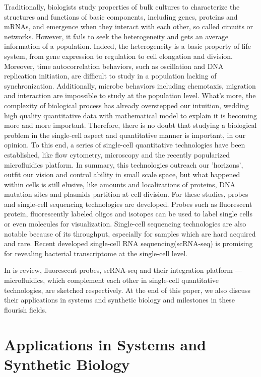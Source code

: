 \documentclass[fleqn,10pt]{wlscirep}
\begin{document}
Traditionally, biologists study properties of bulk cultures to characterize the structures and functions of basic components, including genes, proteins and mRNAs, and emergence when they interact with each other, so called circuits or networks. However, it fails to seek the heterogeneity and gets an average information of a population. Indeed, the heterogeneity is a basic property of life system, from gene expression to regulation to cell elongation and division. Moreover, time autocorrelation behaviors, such as oscillation\cite{Ishiura1998, Elowitz2000} and DNA replication initiation\cite{Wang2010, Wallden2016}, are difficult to study in a population lacking of synchronization. Additionally, microbe behaviors including chemotaxis, migration and interaction are impossible to study at the population level. What's more, the complexity of biological process has already overstepped our intuition, wedding high quality quantitative data with mathematical model to explain it is becoming more and more important\cite{Amir:2018b4f}. Therefore, there is no doubt that studying a biological problem in the single-cell aspect and quantitative manner is important, in our opinion. To this end, a series of single-cell quantitative technologies have been established, like flow cytometry, microscopy and the recently popularized microfluidics platform. In summary, this technologies outreach our 'horizons', outfit our vision and control ability in small scale space, but what happened within cells is still elusive, like amounts and localizations of proteins, DNA mutation sites and plasmids partition at cell division. For these studies, probes and single-cell sequencing technologies are developed. Probes such as fluorescent protein, fluorescently labeled oligos and isotopes can be used to label single cells or even molecules for visualization. Single-cell sequencing technologies are also notable because of its throughput, especially for samples which are hard acquired and rare. Recent developed single-cell RNA sequencing(scRNA-seq) is promising for revealing bacterial transcriptome at the single-cell level.

In is review, fluorescent probes, scRNA-seq and their integration platform --- microfluidics, which complement each other in single-cell quantitative technologies, are sketched respectively. At the end of this paper, we also discuss their applications in systems and synthetic biology and milestones in these flourish fields.

\section[]{Applications in Systems and Synthetic Biology}
\end{document}
